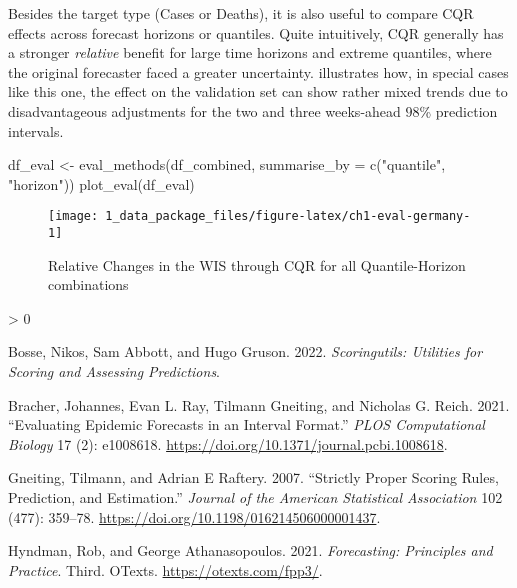 \documentclass[
]{article}
\newenvironment{Shaded}{\begin{snugshade}}{\end{snugshade}}
\newcommand{\AttributeTok}[1]{\textcolor[rgb]{0.77,0.63,0.00}{#1}}
\newcommand{\FunctionTok}[1]{\textcolor[rgb]{0.00,0.00,0.00}{#1}}
\newcommand{\NormalTok}[1]{#1}
\newcommand{\OtherTok}[1]{\textcolor[rgb]{0.56,0.35,0.01}{#1}}
\newcommand{\StringTok}[1]{\textcolor[rgb]{0.31,0.60,0.02}{#1}}
\newlength{\cslhangindent}
\newenvironment{CSLReferences}[2] %
 {%
  \setlength{\parindent}{0pt}
  \ifodd #1 \everypar{\setlength{\hangindent}{\cslhangindent}}\ignorespaces\fi
  \ifnum #2 > 0
  \setlength{\parskip}{#2\baselineskip}
  \fi
 }%
 {}
\begin{document}
Besides the target type (Cases or Deaths), it is also useful to compare CQR effects across forecast horizons or quantiles.
Quite intuitively, CQR generally has a stronger \emph{relative} benefit for large time horizons and extreme quantiles, where the original forecaster faced a greater uncertainty.
 illustrates how, in special cases like this one, the effect on the validation set can show rather mixed trends due to disadvantageous adjustments for the two and three weeks-ahead \(98\)\% prediction intervals.

\begin{Shaded}
\begin{Highlighting}[]
\NormalTok{df\_eval }\OtherTok{\textless{}{-}} \FunctionTok{eval\_methods}\NormalTok{(df\_combined, }\AttributeTok{summarise\_by =} \FunctionTok{c}\NormalTok{(}\StringTok{"quantile"}\NormalTok{, }\StringTok{"horizon"}\NormalTok{))}
\FunctionTok{plot\_eval}\NormalTok{(df\_eval)}
\end{Highlighting}
\end{Shaded}

\begin{figure}

{\centering \texttt{[image: 1\_data\_package\_files/figure-latex/ch1-eval-germany-1]} 

}

\caption{Relative Changes in the WIS through CQR for all Quantile-Horizon combinations}\label{fig:ch1-eval-germany}
\end{figure}

\hypertarget{refs}{}
\begin{CSLReferences}{1}{0}
\leavevmode\hypertarget{ref-R-scoringutils}{}%
Bosse, Nikos, Sam Abbott, and Hugo Gruson. 2022. \emph{Scoringutils: Utilities for Scoring and Assessing Predictions}.

\leavevmode\hypertarget{ref-bracher2021}{}%
Bracher, Johannes, Evan L. Ray, Tilmann Gneiting, and Nicholas G. Reich. 2021. {``Evaluating Epidemic Forecasts in an Interval Format.''} \emph{PLOS Computational Biology} 17 (2): e1008618. \url{https://doi.org/10.1371/journal.pcbi.1008618}.

\leavevmode\hypertarget{ref-gneiting2007}{}%
Gneiting, Tilmann, and Adrian E Raftery. 2007. {``Strictly {Proper Scoring Rules}, {Prediction}, and {Estimation}.''} \emph{Journal of the American Statistical Association} 102 (477): 359--78. \url{https://doi.org/10.1198/016214506000001437}.

\leavevmode\hypertarget{ref-hyndman2021}{}%
Hyndman, Rob, and George Athanasopoulos. 2021. \emph{Forecasting: Principles and Practice}. Third. {OTexts}. \url{https://otexts.com/fpp3/}.

\end{CSLReferences}
\end{document}
